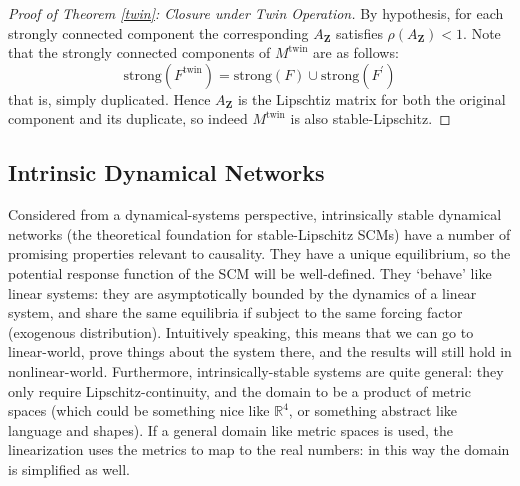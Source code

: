 \documentclass[letterpaper,10pt]{article}
\newtheorem{conjecture}{Conjecture}
\newtheorem{remark}{Remark}
\newcommand\R{\mathbb{R}}
\begin{document}
\begin{proof}[Proof of Theorem \ref{twin}: Closure under Twin Operation]
By hypothesis, for each strongly connected component the corresponding $A_\mathbf{Z}$ satisfies $\rho(A_\mathbf{Z})<1$.
Note that the strongly connected components of $M^{\text{twin}}$ are as follows:
\[
\text{strong}(F^{\text{twin}})=\text{strong}(F)\cup\text{strong}(F^\prime)
\]
that is, simply duplicated.
Hence $A_\mathbf{Z}$ is the Lipschtiz matrix for both the original component and its duplicate, so indeed $M^{\text{twin}}$ is also stable-Lipschitz.
\end{proof}



\subsection{Intrinsic Dynamical Networks}\label{intrinsic-appendix}

Considered from a dynamical-systems perspective, intrinsically stable dynamical networks (the theoretical foundation for stable-Lipschitz SCMs) have a number of promising properties relevant to causality. They have a unique equilibrium, so the potential response function of the SCM will be well-defined. They `behave’ like linear systems: they are asymptotically bounded by the dynamics of a linear system, and share the same equilibria if subject to the same forcing factor (exogenous distribution). Intuitively speaking, this means that we can go to linear-world, prove things about the system there, and the results will still hold in nonlinear-world. Furthermore, intrinsically-stable systems are quite general: they only require Lipschitz-continuity, and the domain to be a product of metric spaces (which could be something nice like $\R^4$, or something abstract like language and shapes). If a general domain like metric spaces is used, the linearization uses the metrics to map to the real numbers: in this way the domain is simplified as well.
\end{document}
